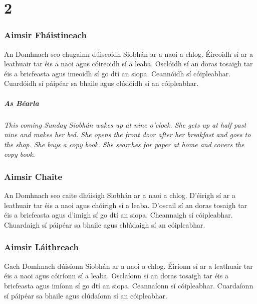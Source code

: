 \documentclass[article,a4paper,oneside,12pt]{memoir}
\begin{document}
\chapter*{2}
\subsection*{Aimsir Fháistineach}
An Domhnach seo chugainn dúiseoidh Siobhán ar a naoi a chlog. \'{E}ireoidh sí ar a leathuair tar \'{e}is a naoi agus cóireoidh sí a leaba. Osclóidh sí an doras tosaigh tar \'{e}is a bricfeasta agus imeoidh sí go dtí an siopa. Ceannóidh sí cóipleabhar. Cuardóidh sí páip\'{e}ar sa bhaile agus clúdóidh sí an cóipleabhar.
\paragraph{As B\'{e}arla}\emph{This coming Sunday Siobhán wakes up at nine o'clock. She gets up at half past nine and makes her bed. She opens the front door after her breakfast and goes to the shop. She buys a copy book. She searches for paper at home and covers the copy book.}

\subsection*{Aimsir Chaite}
An Domhnach seo caite dhúisigh Siobhán ar a naoi a chlog. D'\'{e}irigh sí ar a leathuair tar \'{e}is a naoi agus chóirigh sí a leaba. D'oscail sí an doras tosaigh tar \'{e}is a bricfeasta agus d'imigh sí go dtí an siopa. Cheannaigh sí cóipleabhar. Chuardaigh sí páip\'{e}ar sa bhaile agus chlúdaigh sí an cóipleabhar.

\subsection*{Aimsir Láithreach}
Gach Domhnach dúisíonn Siobhán ar a naoi a chlog. \'{E}iríonn sí ar a leathuair tar \'{e}is a naoi agus cóiríonn sí a leaba. Osclaíonn sí an doras tosaigh tar \'{e}is a bricfeasta agus imíonn sí go dtí an siopa. Ceannaíonn sí cóipleabhar. Cuardaíonn sí páip\'{e}ar sa bhaile agus clúdaíonn sí an cóipleabhar.
\end{document}
